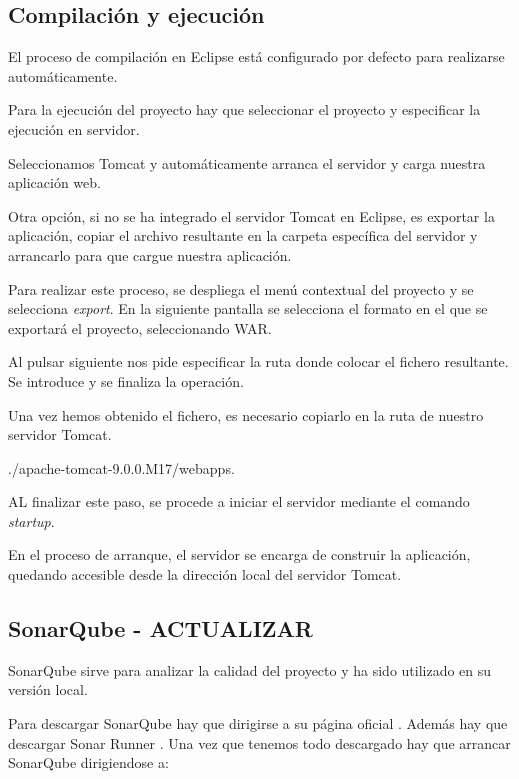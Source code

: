 \subsection{Compilación y ejecución}

El proceso de compilación en Eclipse está configurado por defecto para realizarse automáticamente.

Para la ejecución del proyecto hay que seleccionar el proyecto y especificar la ejecución en servidor.


Seleccionamos Tomcat y automáticamente arranca el servidor y carga nuestra aplicación web.

Otra opción, si no se ha integrado el servidor Tomcat en Eclipse, es exportar la aplicación, copiar el archivo resultante en la carpeta específica del servidor y arrancarlo para que cargue nuestra aplicación.

Para realizar este proceso, se despliega el menú contextual del proyecto y se selecciona \emph{export}. En la siguiente pantalla se selecciona el formato en el que se exportará el proyecto, seleccionando WAR.


Al pulsar siguiente nos pide especificar la ruta donde colocar el fichero resultante. Se introduce y se finaliza la operación.


Una vez hemos obtenido el fichero, es necesario copiarlo en la ruta de nuestro servidor Tomcat.

./apache-tomcat-9.0.0.M17/webapps.

AL finalizar este paso, se procede a iniciar el servidor mediante el comando \emph{startup}.


En el proceso de arranque, el servidor se encarga de construir la aplicación, quedando accesible desde la dirección local del servidor Tomcat.

\subsection{SonarQube - ACTUALIZAR}

SonarQube sirve para analizar la calidad del proyecto y ha sido utilizado en su versión local.

Para descargar SonarQube hay que dirigirse a su página oficial \cite{down:sonq}. Además hay que descargar Sonar Runner \cite{down:sonr}. Una vez que tenemos todo descargado hay que arrancar SonarQube dirigiendose a:

